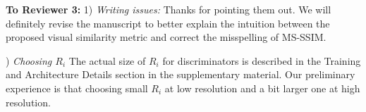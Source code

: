 \documentclass[10pt,twocolumn,letterpaper]{article}
\begin{document}
\noindent
\textbf{To Reviewer 3:} 1) \textit{Writing issues:} Thanks for pointing them out. We will definitely revise the manuscript to better explain the intuition between the proposed visual similarity metric and correct the misspelling of MS-SSIM.

) \textit{Choosing $R_i$} The actual size of $R_i$ for discriminators is described in the Training and Architecture Details section in the supplementary material. Our preliminary experience is that choosing small $R_i$ at low resolution and a bit larger one at high resolution.




%		

%
%
%
\end{document}
